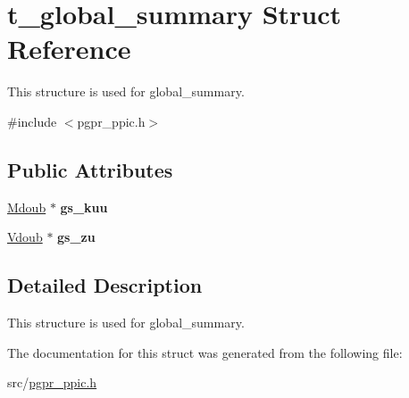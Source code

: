 \hypertarget{structt__global__summary}{\section{t\+\_\+global\+\_\+summary Struct Reference}
\label{structt__global__summary}
}


This structure is used for global\+\_\+summary.  




{\ttfamily \#include $<$pgpr\+\_\+ppic.\+h$>$}

\subsection*{Public Attributes}
\begin{DoxyCompactItemize}
\item 
\hypertarget{structt__global__summary_a1e5de710a9a5f62402b03070b84268a7}{\hyperlink{classpgpr__matrix}{Mdoub} $\ast$ {\bfseries gs\+\_\+kuu}}\label{structt__global__summary_a1e5de710a9a5f62402b03070b84268a7}

\item 
\hypertarget{structt__global__summary_ae0a0cb86f74d014c815e9060c4eaa4d8}{\hyperlink{classpgpr__vector}{Vdoub} $\ast$ {\bfseries gs\+\_\+zu}}\label{structt__global__summary_ae0a0cb86f74d014c815e9060c4eaa4d8}

\end{DoxyCompactItemize}


\subsection{Detailed Description}
This structure is used for global\+\_\+summary. 

The documentation for this struct was generated from the following file\+:\begin{DoxyCompactItemize}
\item 
src/\hyperlink{pgpr__ppic_8h}{pgpr\+\_\+ppic.\+h}\end{DoxyCompactItemize}
